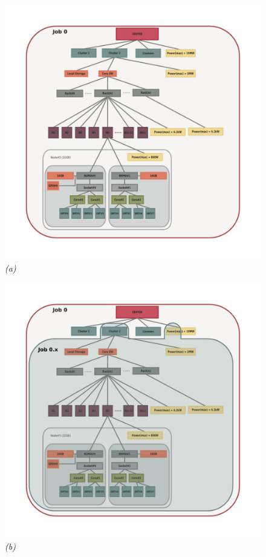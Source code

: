 \documentclass{article}
\begin{document}
\begin{figure}
\begin{minipage}{0.5\linewidth}
  \begin{center}
  \includegraphics[scale=0.45]{job-hierarchy-job0}
  {\em (a)}
  \end{center}
\end{minipage}
\begin{minipage}{0.5\linewidth}
  \begin{center}
  \includegraphics[scale=0.45]{job-hierarchy-job0-x}
  {\em (b)}
  \end{center}
\end{minipage}


\end{figure}
\end{document}
